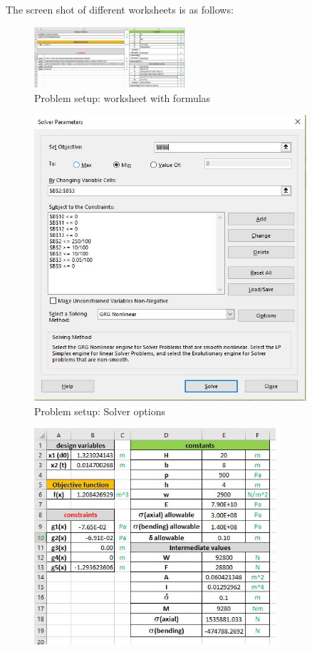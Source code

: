 \documentclass[12pt]{article}
\begin{document}
\begin{enumerate}[I]
\begin{enumerate}[1)]
The screen shot of different worksheets is as follows:\\
\newpage
\begin{figure}[!hp]
  \centering
    \includegraphics[angle=90,width=0.5\textwidth]{formulas.JPG}
  \caption{Problem setup: worksheet with formulas}
  \label{fig:excel formulas}
\end{figure}
\begin{figure}[!hp]
  \centering
    \includegraphics[width=0.9\textwidth]{solver.JPG}
  \caption{Problem setup: Solver options}
  \label{fig: excel solver option}
\end{figure}
\newpage
\begin{figure}[!hp]
  \centering
    \includegraphics[width=0.8\textwidth]{after.JPG}

\end{figure}
\end{enumerate}
\end{enumerate}
\end{document}
